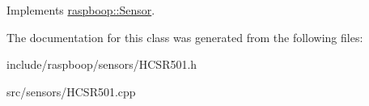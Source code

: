 Implements \hyperlink{classraspboop_1_1Sensor_ab854a10682373803a310c078bb71aacf}{raspboop\-::\-Sensor}.



The documentation for this class was generated from the following files\-:\begin{DoxyCompactItemize}
\item 
include/raspboop/sensors/H\-C\-S\-R501.\-h\item 
src/sensors/H\-C\-S\-R501.\-cpp\end{DoxyCompactItemize}
